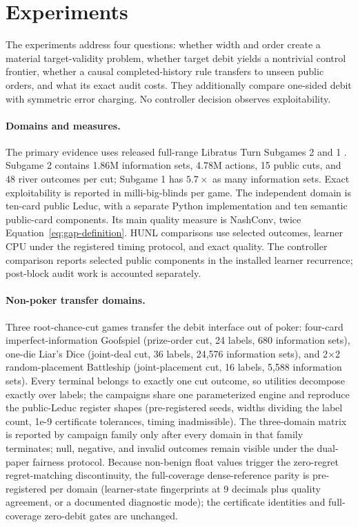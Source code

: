 \section{Experiments}
\label{sec:experiments}

The experiments address four questions: whether width and order create a
material target-validity problem, whether target debit yields a nontrivial
control frontier, whether a causal completed-history rule transfers to unseen
public orders, and what its exact audit costs.  They additionally compare
one-sided debit with symmetric error charging.  No controller decision
observes exploitability.

\paragraph{Domains and measures.}
The primary evidence uses released full-range Libratus Turn Subgames 2 and 1
\citep{brown2017libratus}.  Subgame 2 contains 1.86M information sets, 4.78M
actions, 15 public cuts, and 48 river outcomes per cut; Subgame 1 has
$5.7\times$ as many information sets.  Exact exploitability is reported in
milli-big-blinds per game.  The independent domain is ten-card public Leduc,
with a separate Python implementation and ten semantic public-card
components.  Its main quality measure is NashConv, twice
Equation~\ref{eq:gap-definition}.  HUNL comparisons use selected outcomes,
learner CPU under the registered timing protocol, and exact quality.  The
controller comparison reports selected public components in the installed
learner recurrence; post-block audit work is accounted separately.

\paragraph{Non-poker transfer domains.}
Three root-chance-cut games transfer the debit interface out of poker: four-card
imperfect-information Goofspiel (prize-order cut, 24 labels, 680 information
sets), one-die Liar's Dice (joint-deal cut, 36 labels, 24{,}576 information
sets), and 2$\times$2 random-placement Battleship (joint-placement cut, 16
labels, 5{,}588 information sets).  Every terminal belongs to exactly one cut
outcome, so utilities decompose exactly over labels; the campaigns share one
parameterized engine and reproduce the public-Leduc register shapes
(pre-registered seeds, widths dividing the label count, 1e-9 certificate
tolerances, timing inadmissible).  The three-domain matrix is reported by
campaign family only after every domain in that family terminates; null,
negative, and invalid outcomes remain visible under the dual-paper fairness
protocol.  Because non-benign float values trigger the
zero-regret regret-matching discontinuity, the full-coverage dense-reference
parity is pre-registered per domain (learner-state fingerprints at 9 decimals
plus quality agreement, or a documented diagnostic mode); the certificate
identities and full-coverage zero-debit gates are unchanged.

